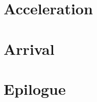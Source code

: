 \documentclass[11pt]{memoir}
\begin{document}
	\cleartoverso
  \part{Acceleration}
  

	\cleartoverso
  \part{Arrival}
  

	\cleartoverso
  \part*{Epilogue}
  

  \backmatter

  \markboth{}{}


  \cleartoverso
  
\end{document}
